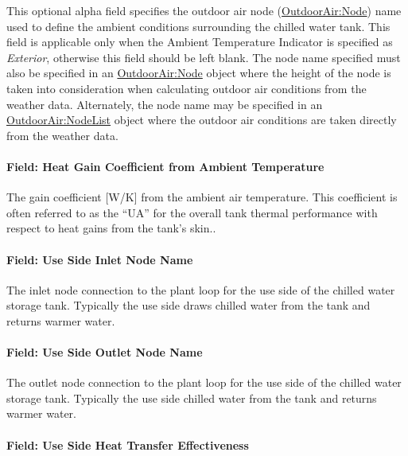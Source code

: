 This optional alpha field specifies the outdoor air node (\hyperref[outdoorairnode]{OutdoorAir:Node}) name used to define the ambient conditions surrounding the chilled water tank. This field is applicable only when the Ambient Temperature Indicator is specified as \emph{Exterior}, otherwise this field should be left blank. The node name specified must also be specified in an \hyperref[outdoorairnode]{OutdoorAir:Node} object where the height of the node is taken into consideration when calculating outdoor air conditions from the weather data. Alternately, the node name may be specified in an \hyperref[outdoorairnodelist]{OutdoorAir:NodeList} object where the outdoor air conditions are taken directly from the weather data.

\paragraph{Field: Heat Gain Coefficient from Ambient Temperature}\label{field-heat-gain-coefficient-from-ambient-temperature}

The gain coefficient {[}W/K{]} from the ambient air temperature. This coefficient is often referred to as the ``UA'' for the overall tank thermal performance with respect to heat gains from the tank's skin..

\paragraph{Field: Use Side Inlet Node Name}\label{field-use-side-inlet-node-name}

The inlet node connection to the plant loop for the use side of the chilled water storage tank. Typically the use side draws chilled water from the tank and returns warmer water.

\paragraph{Field: Use Side Outlet Node Name}\label{field-use-side-outlet-node-name}

The outlet node connection to the plant loop for the use side of the chilled water storage tank. Typically the use side chilled water from the tank and returns warmer water.

\paragraph{Field: Use Side Heat Transfer Effectiveness}\label{field-use-side-heat-transfer-effectiveness}

